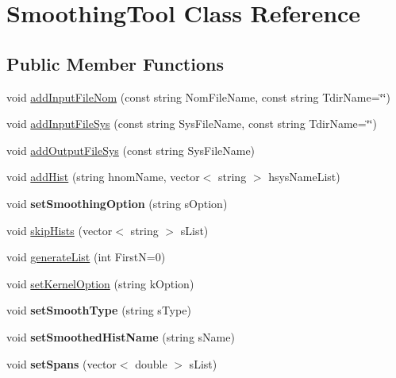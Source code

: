 \hypertarget{classSmoothingTool}{
\section{SmoothingTool Class Reference}
\label{classSmoothingTool}
}
\subsection*{Public Member Functions}
\begin{DoxyCompactItemize}
\item 
void \hyperlink{classSmoothingTool_ab4ed389aff32080bc9849abb237cc58c}{addInputFileNom} (const string NomFileName, const string TdirName=\char`\"{}\char`\"{})
\item 
void \hyperlink{classSmoothingTool_acd749c135533838fa53bffc961241a90}{addInputFileSys} (const string SysFileName, const string TdirName=\char`\"{}\char`\"{})
\item 
void \hyperlink{classSmoothingTool_acebcdc9de5c01a9e5a4fae7253f4fa7b}{addOutputFileSys} (const string SysFileName)
\item 
void \hyperlink{classSmoothingTool_a044eda85524db01f38851c5a0c7e863f}{addHist} (string hnomName, vector$<$ string $>$ hsysNameList)
\item 
\hypertarget{classSmoothingTool_aa3959916f76f8c3360165beb9a09e70d}{
void {\bfseries setSmoothingOption} (string sOption)}
\label{classSmoothingTool_aa3959916f76f8c3360165beb9a09e70d}

\item 
void \hyperlink{classSmoothingTool_a28efec9f77ecd383a7a3209dfad43cf0}{skipHists} (vector$<$ string $>$ sList)
\item 
void \hyperlink{classSmoothingTool_a980fda8c4c47dac4db2347e51ec435cd}{generateList} (int FirstN=0)
\item 
void \hyperlink{classSmoothingTool_ae66c92826009ac6afe84a383ca74e4a7}{setKernelOption} (string kOption)
\item 
\hypertarget{classSmoothingTool_aaf9639c751730242a07ea1a8be48691f}{
void {\bfseries setSmoothType} (string sType)}
\label{classSmoothingTool_aaf9639c751730242a07ea1a8be48691f}

\item 
\hypertarget{classSmoothingTool_a858c6172836081a3f778e06f839f10dd}{
void {\bfseries setSmoothedHistName} (string sName)}
\label{classSmoothingTool_a858c6172836081a3f778e06f839f10dd}

\item 
\hypertarget{classSmoothingTool_a043705474445af954f5a884b2f9a8ec5}{
void {\bfseries setSpans} (vector$<$ double $>$ sList)}
\label{classSmoothingTool_a043705474445af954f5a884b2f9a8ec5}


\end{DoxyCompactItemize}
